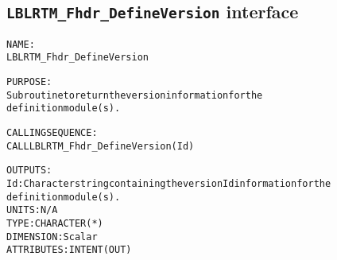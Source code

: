 \subsection{\texttt{LBLRTM\_Fhdr\_DefineVersion} interface}
  \label{sec:LBLRTM_Fhdr_DefineVersion_interface}
  \begin{alltt}
 
  NAME:
        LBLRTM_Fhdr_DefineVersion
 
  PURPOSE:
        Subroutine to return the version information for the
        definition module(s).
 
  CALLING SEQUENCE:
        CALL LBLRTM_Fhdr_DefineVersion( Id )
 
  OUTPUTS:
        Id:     Character string containing the version Id information for the
                definition module(s).
                UNITS:      N/A
                TYPE:       CHARACTER(*)
                DIMENSION:  Scalar
                ATTRIBUTES: INTENT(OUT)
 
  \end{alltt}
